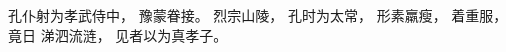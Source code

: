 
\switchcolumn*[\section{}]

孔仆射为孝武侍中，
豫蒙眷接。
烈宗山陵，
孔时为太常，
形素羸瘦，
着重服，
竟日
涕泗流涟，
见者以为真孝子。

\switchcolumn



